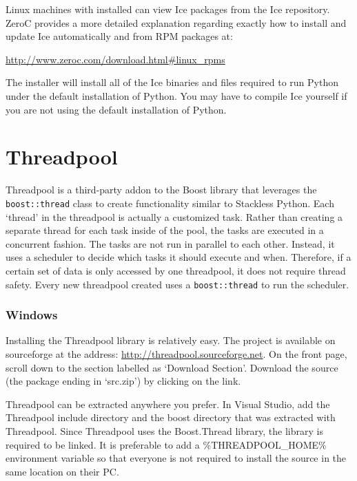 Linux machines with  installed can view Ice packages from the Ice repository.
ZeroC provides a more detailed explanation regarding exactly how to install and update Ice
automatically and from RPM packages at:

\vspace{1.0ex}
\centerline{\url{http://www.zeroc.com/download.html\#linux\_rpms}}

The  installer will install all of the Ice binaries and files required to run
Python under the default installation of Python. You may have to compile Ice yourself if you are
not using the default installation of Python.

\section{Threadpool}

Threadpool is a third-party addon to the Boost library that leverages the
\lstinline!boost::thread! class to create functionality similar to Stackless Python. Each
`thread' in the threadpool is actually a customized task. Rather than creating a separate thread
for each task inside of the pool, the tasks are executed in a concurrent fashion. The tasks are
not run in parallel to each other.  Instead, it uses a scheduler to decide which tasks it should
execute and when. Therefore, if a certain set of data is only accessed by one threadpool, it
does not require thread safety.  Every new
threadpool created uses a \lstinline!boost::thread! to run the scheduler.

\subsubsection*{Windows}

Installing the Threadpool library is relatively easy. The project is available on sourceforge at
the address: \url{http://threadpool.sourceforge.net}. On the front page, scroll down to the
section labelled as `Download Section'. Download the source (the package ending in `src.zip') by
clicking on the link.

Threadpool can be extracted anywhere you prefer. In Visual Studio, add the Threadpool include
directory and the boost directory that was extracted with Threadpool. Since Threadpool uses the
Boost.Thread library, the  library is required to be linked. It
is preferable to add a \%THREADPOOL\_HOME\% environment variable so that everyone is not
required to install the source in the same location on their PC.

